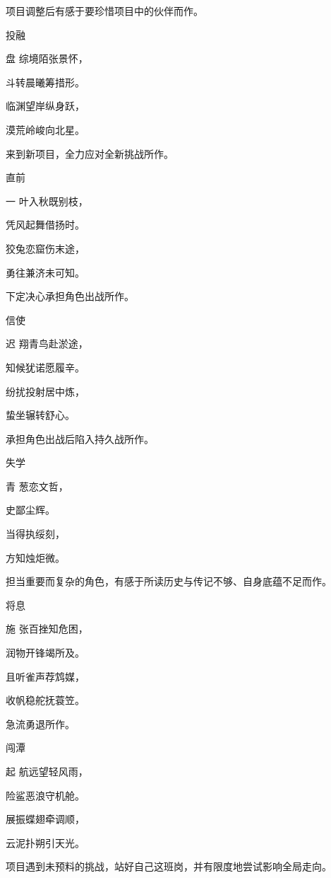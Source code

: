 \documentclass{article}
\newenvironment{poem}[3]{
\begin{minipage}{\textwidth}
\begin{pinyinscope}\begin{center}\Large\linespread{1.4}\selectfont #2\end{center}\end{pinyinscope}
\begin{pinyinscope}
	\begin{center}
	\Large\linespread{1.4}\rmfamily\selectfont #3
}{\end{center}
\end{pinyinscope}
\end{minipage}
}
\begin{document}
项目调整后有感于要珍惜项目中的伙伴而作。

\begin{poem}{}{投融}
盘综境陌张景怀，

斗转晨曦筹措形。

临渊望岸纵身跃，

漠荒岭峻向北星。
\end{poem}

来到新项目，全力应对全新挑战所作。

\begin{poem}{}{直前}
一叶入秋既别枝，

凭风起舞借扬时。

狡兔恋窟伤末途，

勇往兼济未可知。
\end{poem}

下定决心承担角色出战所作。

\begin{poem}{}{信使}
迟翔青鸟赴淤途，

知候犹诺愿履辛。

纷扰投射居中炼，

蛰坐辗转舒{}心。
\end{poem}

承担角色出战后陷入持久战所作。

\begin{poem}{}{失学}
青葱恋文哲，

史{}鄙尘辉。

当得执绥刻，

方知烛炬微。
\end{poem}

担当重要而复杂的角色，有感于所读历史与传记不够、自身底蕴不足而作。

\begin{poem}{}{将息}
施张百挫知危困，

润物开锋竭所及。

且听雀声荐鸩媒，

收帆稳舵抚蓑笠。
\end{poem}

急流勇退所作。

\begin{poem}{}{闯潭}
起航远望轻风雨，

险鲨恶浪守机舱。

展振蝶翅牵调顺，

云泥扑朔引天光。
\end{poem}

项目遇到未预料的挑战，站好自己这班岗，并有限度地尝试影响全局走向。
\end{document}
